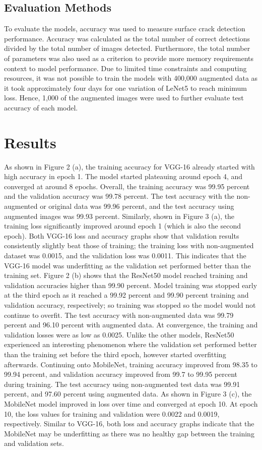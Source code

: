 \documentclass[conference]{IEEEtran}
\begin{document}
\subsection{Evaluation Methods}
To evaluate the models, accuracy was used to measure surface crack detection performance. Accuracy was calculated as the total number of correct detections divided by the total number of images detected. Furthermore, the total number of parameters was also used as a criterion to provide more memory requirements context to model performance. Due to limited time constraints and computing resources, it was not possible to train the models with 400,000 augmented data as it took approximately four days for one variation of LeNet5 to reach minimum loss. Hence, 1,000 of the augmented images were used to further evaluate test accuracy of each model.
\section{Results}
As shown in Figure 2 (a), the training accuracy for VGG-16 already started with high accuracy in epoch 1. The model started plateauing around epoch 4, and converged at around 8 epochs. Overall, the training accuracy was 99.95 percent and the validation accuracy was 99.78 percent. The test accuracy with the non-augmented or original data was 99.96 percent, and the test accuracy using augmented images was 99.93 percent. Similarly, shown in Figure 3 (a), the training loss significantly improved around epoch 1 (which is also the second epoch). Both VGG-16 loss and accuracy graphs show that validation results consistently slightly beat those of training; the training loss with non-augmented dataset was 0.0015, and the validation loss was 0.0011. This indicates that the VGG-16 model was underfitting as the validation set performed better than the training set.
Figure 2 (b) shows that the ResNet50 model reached training and validation accuracies higher than 99.90 percent. Model training was stopped early at the third epoch as it reached a 99.92 percent and 99.90 percent training and validation accuracy, respectively; so training was stopped so the model would not continue to overfit. The test accuracy with non-augmented data was 99.79 percent and 96.10 percent with augmented data. At convergence, the training and validation losses were as low as 0.0025. Unlike the other models, ResNet50 experienced an interesting phenomenon where the validation set performed better than the training set before the third epoch, however started overfitting afterwards.
Continuing onto MobileNet, training accuracy improved from 98.35 to 99.94 percent, and validation accuracy improved from 99.7 to 99.95 percent during training. The test accuracy using non-augmented test data was 99.91 percent, and 97.60 percent using augmented data. As shown in Figure 3 (c), the MobileNet model improved in loss over time and converged at epoch 10. At epoch 10, the loss values for training and validation were 0.0022 and 0.0019, respectively. Similar to VGG-16, both loss and accuracy graphs indicate that the MobileNet may be underfitting as there was no healthy gap between the training and validation sets.
\end{document}

